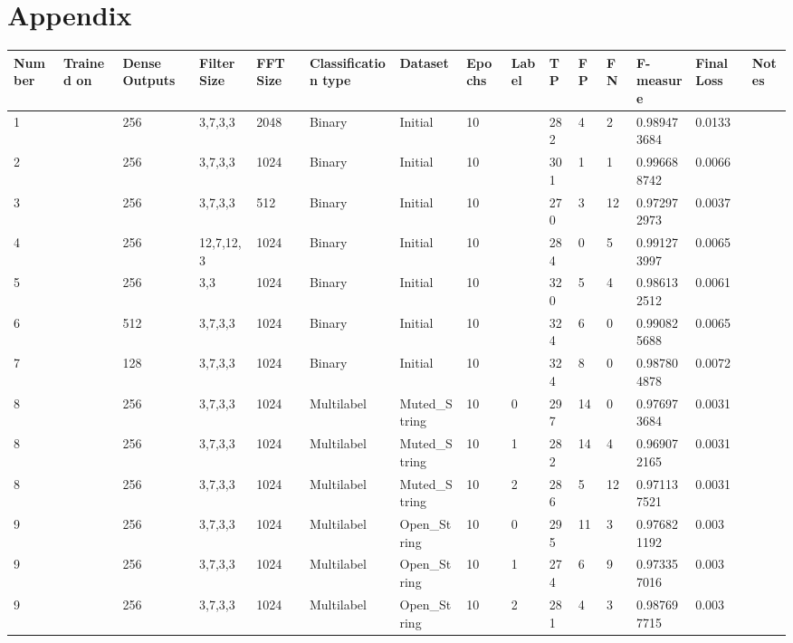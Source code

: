 \documentclass[conference]{IEEEtran}
\begin{document}
\section{Appendix}
\begin{table}[!ht]
     \centering
     \begin{adjustbox}{width=\textwidth}
     \begin{tabular}{|l|l|l|l|l|l|l|l|l|l|l|l|l|l|l|}
        \hline
        Number & Trained on & Dense Outputs & Filter Size & FFT Size & Classification type & Dataset & Epochs & Label & TP & FP & FN & F-measure & Final Loss & Notes \\ \hline
        1 & ~ & 256 & 3,7,3,3 & 2048 & Binary & Initial & 10 & ~ & 282 & 4 & 2 & 0.989473684 & 0.0133 & ~ \\ \hline
        2 & ~ & 256 & 3,7,3,3 & 1024 & Binary & Initial & 10 & ~ & 301 & 1 & 1 & 0.996688742 & 0.0066 & ~ \\ \hline
        3 & ~ & 256 & 3,7,3,3 & 512 & Binary & Initial & 10 & ~ & 270 & 3 & 12 & 0.972972973 & 0.0037 & ~ \\ \hline
        4 & ~ & 256 & 12,7,12,3 & 1024 & Binary & Initial & 10 & ~ & 284 & 0 & 5 & 0.991273997 & 0.0065 & ~ \\ \hline
        5 & ~ & 256 & 3,3 & 1024 & Binary & Initial & 10 & ~ & 320 & 5 & 4 & 0.986132512 & 0.0061 & ~ \\ \hline
        6 & ~ & 512 & 3,7,3,3 & 1024 & Binary & Initial & 10 & ~ & 324 & 6 & 0 & 0.990825688 & 0.0065 & ~ \\ \hline
        7 & ~ & 128 & 3,7,3,3 & 1024 & Binary & Initial & 10 & ~ & 324 & 8 & 0 & 0.987804878 & 0.0072 & ~ \\ \hline
        8 & ~ & 256 & 3,7,3,3 & 1024 & Multilabel & Muted\_String & 10 & 0 & 297 & 14 & 0 & 0.976973684 & 0.0031 & ~ \\ \hline
        8 & ~ & 256 & 3,7,3,3 & 1024 & Multilabel & Muted\_String & 10 & 1 & 282 & 14 & 4 & 0.969072165 & 0.0031 & ~ \\ \hline
        8 & ~ & 256 & 3,7,3,3 & 1024 & Multilabel & Muted\_String & 10 & 2 & 286 & 5 & 12 & 0.971137521 & 0.0031 & ~ \\ \hline
        9 & ~ & 256 & 3,7,3,3 & 1024 & Multilabel & Open\_String & 10 & 0 & 295 & 11 & 3 & 0.976821192 & 0.003 & ~ \\ \hline
        9 & ~ & 256 & 3,7,3,3 & 1024 & Multilabel & Open\_String & 10 & 1 & 274 & 6 & 9 & 0.973357016 & 0.003 & ~ \\ \hline
        9 & ~ & 256 & 3,7,3,3 & 1024 & Multilabel & Open\_String & 10 & 2 & 281 & 4 & 3 & 0.987697715 & 0.003 & ~ \\ \hline

\end{tabular}
\end{adjustbox}
\end{table}
\end{document}
